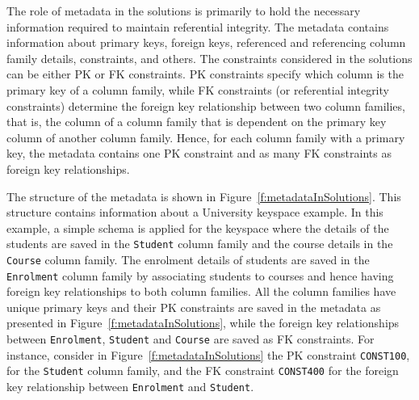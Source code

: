 The role of metadata in  the solutions is primarily to hold the necessary
 information required to maintain referential integrity. The metadata contains  
 information about primary keys,   foreign keys,  referenced and referencing
 column family details, constraints, and others.  The constraints considered in
 the solutions can be either \ac{PK} or \ac{FK} 
constraints. \ac{PK}
constraints specify which column is the primary key of a column family, while 
\ac{FK} constraints (or referential integrity constraints) determine the
foreign key relationship between two column families, that is, the
 column of a column family that  is dependent on the primary key  column of
 another column family.  Hence, for each column family with a primary key,  the
metadata  contains one \ac{PK} constraint  and  as
many \ac{FK} constraints as foreign key relationships. 

The structure of the metadata is shown in
Figure~\ref{f:metadataInSolutions}.  This structure contains information about
a University keyspace example. In this
 example, a simple schema is applied for the keyspace where  the details of the
 students are saved in  the \texttt{Student} column family and the course
 details in the \texttt{Course} column family. 
 The enrolment details of students are saved in the 
\texttt{Enrolment} column family by associating students to courses and
hence having foreign key relationships to both  column families. All the column
families have unique primary keys and their \ac{PK} constraints are saved in
the metadata as presented in Figure~\ref{f:metadataInSolutions}, while the
foreign key relationships between \texttt{Enrolment}, \texttt{Student} and
\texttt{Course} are saved as \ac{FK} constraints.  For instance, consider in
 Figure~\ref{f:metadataInSolutions} the \ac{PK} constraint \texttt{CONST100},
 for the \texttt{Student} column family, and the \ac{FK} constraint  
 \texttt{CONST400} for the foreign key relationship between
\texttt{Enrolment} and \texttt{Student}.

